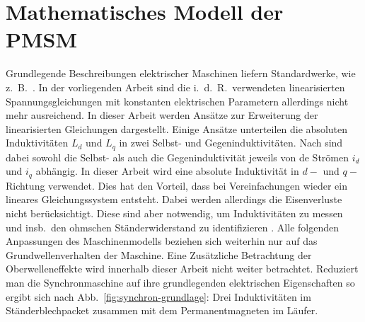 \documentclass[conference,twocolumn]{IEEEtran}
\begin{document}

\section{Mathematisches Modell der PMSM}\label{sec:math-pmsm}

Grundlegende Beschreibungen elektrischer Maschinen liefern Standardwerke, wie z.~B.\ \autocites{mullerII2008}{mullerI2005}{fischer2009}{schroder2000}.
In der vorliegenden Arbeit sind die i.\ d.\ R.\ verwendeten linearisierten Spannungsgleichungen mit konstanten elektrischen Parametern allerdings nicht mehr ausreichend.
In dieser Arbeit werden Ansätze zur Erweiterung der linearisierten Gleichungen dargestellt.
Einige Ansätze unterteilen die absoluten Induktivitäten $L_d$ und $L_q$ in zwei Selbst- und Gegeninduktivitäten.
Nach \textcite{sturmberger} sind dabei sowohl die Selbst- als auch die Gegeninduktivität jeweils von de Strömen $i_d$ und $i_q$ abhängig.
In dieser Arbeit wird eine absolute Induktivität in $d-$ und $q-$Richtung verwendet.
Dies hat den Vorteil, dass bei Vereinfachungen wieder ein lineares Gleichungssystem entsteht.
Dabei werden allerdings die Eisenverluste nicht berücksichtigt.
Diese sind aber notwendig, um Induktivitäten zu messen und insb.\ den ohmschen Ständerwiderstand zu identifizieren \autocite{Kellner2012}.
Alle folgenden Anpassungen des Maschinenmodells beziehen sich weiterhin nur auf das Grundwellenverhalten der Maschine.
Eine Zusätzliche Betrachtung der Oberwelleneffekte wird innerhalb dieser Arbeit nicht weiter betrachtet.
Reduziert man die Synchronmaschine auf ihre grundlegenden elektrischen Eigenschaften so ergibt sich nach Abb.~\ref{fig:synchron-grundlage}: Drei Induktivitäten im Ständerblechpacket zusammen mit dem Permanentmagneten im Läufer.
\end{document}
